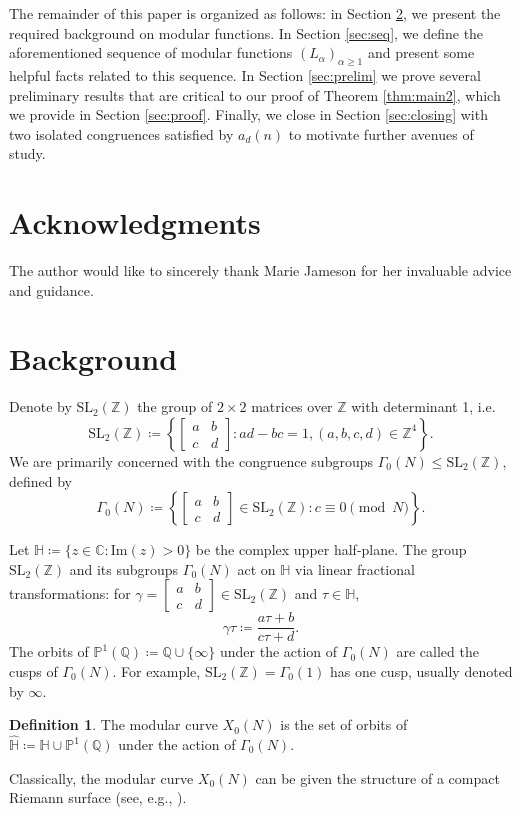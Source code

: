 \documentclass[12pt, reqno]{amsart}
\theoremstyle{definition}
\newtheorem{defn}[thm]{Definition}
\theoremstyle{remark}
\newcommand{\CC}{\mathbb{C}}
\newcommand{\ZZ}{\mathbb{Z}}
\newcommand{\QQ}{\mathbb{Q}}
\newcommand{\HH}{\mathbb{H}}
\newcommand{\SL}{\text{SL}_2(\ZZ)}
\newcommand{\mat}[4]{\begin{bmatrix} #1 & #2 \\ #3 & #4 \end{bmatrix}}
\begin{document}
The remainder of this paper is organized as follows: in Section \ref{sec:background}, we present the required background on modular functions. In Section \ref{sec:seq}, we define the aforementioned sequence of modular functions $(L_\alpha)_{\alpha \geq 1}$ and present some helpful facts related to this sequence. In Section \ref{sec:prelim} we prove several preliminary results that are critical to our proof of Theorem \ref{thm:main2}, which we provide in Section \ref{sec:proof}. Finally, we close in Section \ref{sec:closing} with two isolated congruences satisfied by $a_d(n)$ to motivate further avenues of study. 

\section{Acknowledgments}
The author would like to sincerely thank Marie Jameson for her invaluable advice and guidance. 

\section{Background}\label{sec:background}
Denote by $\SL$ the group of $2 \times 2$ matrices over $\ZZ$ with determinant 1, i.e.
\[\SL \coloneqq \left\{\mat{a}{b}{c}{d} : ad-bc = 1, (a,b,c,d) \in \ZZ^4\right\}.\]
We are primarily concerned with the congruence subgroups $\Gamma_0(N) \leq \SL$, defined by
\[\Gamma_0(N) \coloneqq \left\{\mat{a}{b}{c}{d} \in \SL : c \equiv 0 \pmod{N}\right\}.\]

Let $\HH \coloneqq \{z \in \CC : \text{Im}(z) > 0\}$ be the complex upper half-plane. The group $\SL$ and its subgroups $\Gamma_0(N)$ act on $\HH$ via linear fractional transformations: for $\gamma = \mat{a}{b}{c}{d} \in \SL$ and $\tau \in \HH$, 
\[\gamma \tau \coloneqq \frac{a\tau+b}{c\tau+d}.\]
The orbits of $\mathbb{P}^1(\mathbb{Q}) \coloneqq \QQ \cup \{\infty\}$ under the action of $\Gamma_0(N)$ are called the cusps of $\Gamma_0(N)$. For example, $\SL = \Gamma_0(1)$ has one cusp, usually denoted by $\infty.$ 

\begin{defn}
The modular curve $X_0(N)$ is the set of orbits of $\hat{\mathbb{H}} \coloneqq \mathbb{H} \cup \mathbb{P}^1(\mathbb{Q})$ under the action of $\Gamma_0(N).$
\end{defn}

Classically, the modular curve $X_0(N)$ can be given the structure of a compact Riemann surface (see, e.g., \cite{DS}).  
\end{document}
